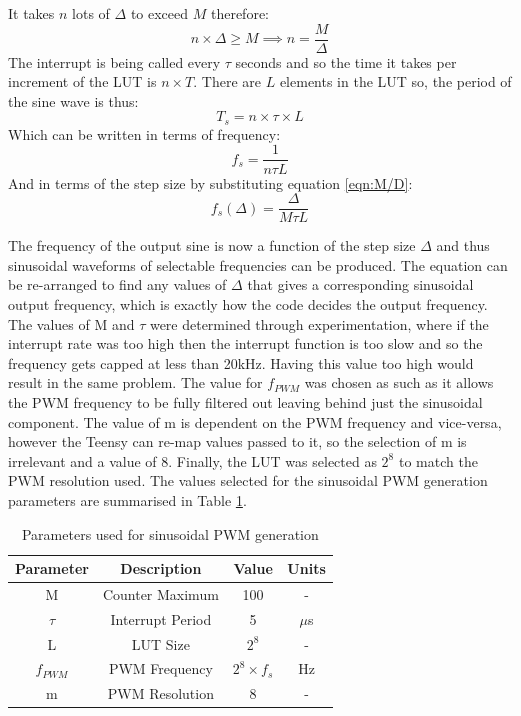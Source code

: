 \documentclass[12pt, a4paper]{article}
\begin{document}
It takes $n$ lots of $\Delta$ to exceed $M$ therefore:
\begin{equation}
	n\times\Delta \ge M \implies n = \frac{M}{\Delta}
	\label{eqn:M/D}
\end{equation}
The interrupt is being called every $\tau$ seconds and so the time it takes per increment of the LUT is $n\times T$. There are $L$ elements in the LUT so, the period of the sine wave is thus:
\begin{equation}
	T_s = n\times \tau\times L
\end{equation}
Which can be written in terms of frequency:
\begin{equation}
	f_s = \frac{1}{n\tau L}
\end{equation}
And in terms of the step size by substituting equation \ref{eqn:M/D}:
\begin{equation}
	f_s(\Delta) = \frac{\Delta}{M\tau L}
\end{equation}

The frequency of the output sine is now a function of the step size $\Delta$ and thus sinusoidal waveforms of selectable frequencies can be produced. The equation can be re-arranged to find any values of $\Delta$ that gives a corresponding sinusoidal output frequency, which is exactly how the code decides the output frequency. \\

The values of M and $\tau$ were determined through experimentation, where if the interrupt rate was too high then the interrupt function is too slow and so the frequency gets capped at less than 20kHz. Having this value too high would result in the same problem. The value for $f_{PWM}$ was chosen as such as it allows the PWM frequency to be fully filtered out leaving behind just the sinusoidal component. The value of m is dependent on the PWM frequency and vice-versa, however the Teensy can re-map values passed to it, so the selection of m is irrelevant and a value of 8. Finally, the LUT was selected as $2^8$ to match the PWM resolution used. The values selected for the sinusoidal PWM generation parameters are summarised in Table \ref{tab:L_sinusoidalPWM}.\\
\begin{table} [!htb]
	\caption{Parameters used for sinusoidal PWM generation}
	\label{tab:L_sinusoidalPWM}
	\centering
	\begin{tabular}{ |c|c|c|c| }
		\hline
		Parameter & Description & Value & Units \\ 
		\hline
		M & Counter Maximum & 100 & - \\ 
		$\tau$ & Interrupt Period & 5 & $\mu$s \\ 
		L & LUT Size & $2^8$ & - \\
		$f_{PWM}$ & PWM Frequency & $2^8\times f_s$ & Hz\\
		m & PWM Resolution & 8 & - \\
		\hline
	\end{tabular}
\end{table}
\end{document}
